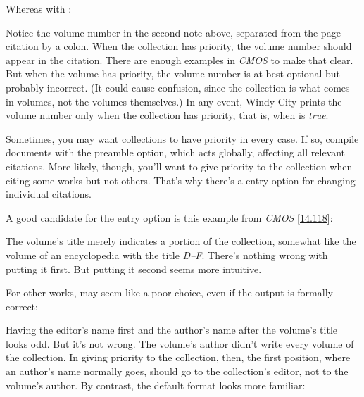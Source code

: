 \documentclass[11pt,letterpaper,oneside]{article}
\begin{document}
\noindent Whereas with :

\begin{citeonly}
\item \cite{armstrong2014}
\item \cite[45]{armstrong2014}
\end{citeonly}

Notice the volume number in the second note above, separated from the
page citation by a colon. When the collection has priority, the volume
number should appear in the citation. There are enough examples in
\textit{CMOS} to make that clear. But when the volume has priority,
the volume number is at best optional but probably incorrect. (It
could cause confusion, since the collection is what comes in volumes,
not the volumes themselves.) In any event, Windy City prints the
volume number only when the collection has priority, that is, when
 is \textit{true}.

Sometimes, you may want collections to have priority in every case. If
so, compile documents with the  preamble option,
which acts globally, affecting all relevant citations. More likely,
though, you'll want to give priority to the collection when citing
some works but not others. That's why there's a  entry
option for changing individual citations.

A good candidate for the entry option is this example from
\textit{CMOS} \ref{14.118}:

\begin{citebib}
\item \cite*{james1963.5}
\end{citebib}

\noindent The volume's title merely indicates a portion of the
collection, somewhat like the volume of an encyclopedia with the title
\textit{D–F}. There's nothing wrong with putting it first. But putting
it second seems more intuitive.

For other works,  may seem like a poor choice, even if
the output is formally correct:

\begin{citebib}
\item \cite{barrows1959}
\end{citebib}

\noindent Having the editor's name first and the author's name after
the volume's title looks odd. But it's not wrong. The volume's author
didn't write every volume of the collection. In giving priority to the
collection, then, the first position, where an author's name normally
goes, should go to the collection's editor, not to the volume's
author. By contrast, the default format looks more familiar:
\end{document}
